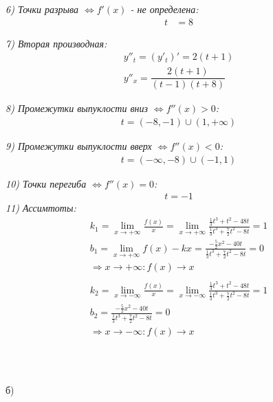 \documentclass[a4paper,11pt]{article}
\begin{document}
\noindent \textsl{6) Точки разрыва $ \Longleftrightarrow f'(x) $  - не определена:}
\begin{align*}
t &= 8
\end{align*}

\noindent \textsl{7) Вторая производная:}
\begin{gather*}	
y''_t = (y'_t)' = 2(t + 1) \\
y''_x = \dfrac{2(t + 1)}{(t - 1)(t + 8)}
\end{gather*}

\noindent \textsl{8) Промежутки  выпуклости вниз $\Longleftrightarrow f''(x) > 0 $:}
\begin{gather*}
t = (-8, -1) \cup (1, +\infty)
\end{gather*}

\noindent \textsl{9) Промежутки  выпуклости вверх $\Longleftrightarrow f''(x) < 0 $:}
\begin{gather*}
t = (-\infty , -8) \cup (-1, 1) 
\end{gather*}

\noindent \textsl{10) Точки перегиба   $\Longleftrightarrow f''(x) = 0 $:}
\begin{align*}
t = -1
\end{align*}
\noindent \textsl{11) Ассимтоты:}
\begin{gather*}
k_1 = \lim_{x \to +\infty} \frac{f(x)}{x} = \lim_{x \to +\infty} \frac{\frac{1}{3}t^3 + t^2 - 48t}{\frac{1}{3}t^3 + \frac{7}{2}t^2 - 8t} = 1 \\
b_1 = \lim_{x \to +\infty} f(x) - kx = \frac{-\frac52x^2 - 40t}{\frac{1}{3}t^3 + \frac{7}{2}t^2 - 8t} = 0 \\
\Rightarrow x \to +\infty: f(x) \to x \\ \\
k_2 = \lim_{x \to -\infty} \frac{f(x)}{x} = \lim_{x \to -\infty} \frac{\frac{1}{3}t^3 + t^2 - 48t}{\frac{1}{3}t^3 + \frac{7}{2}t^2 - 8t} = 1 \\
b_2 = \frac{-\frac52x^2 - 40t}{\frac{1}{3}t^3 + \frac{7}{2}t^2 - 8t} = 0 \\
\Rightarrow x \to -\infty: f(x) \to x \\
\end{gather*}
\\ \\ \\
б)
\end{document}
